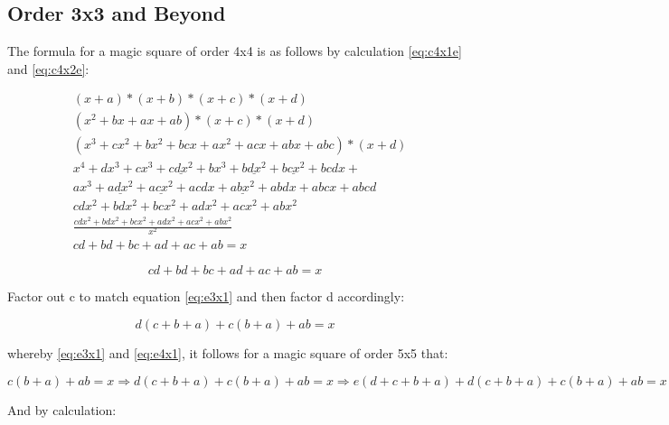 \documentclass[a4paper]{article}
\begin{document}
\subsection{Order 3x3 and Beyond}
The formula for a magic square of order 4x4 is as follows by calculation \eqref{eq:c4x1e} and \eqref{eq:c4x2e}:

\begin{equation*} \begin{aligned}
& (x + a) * (x + b) * (x + c) * (x + d) \\
& (x^2 + bx + ax + ab) * (x + c) * (x + d) \\
& (x^3 + cx^2 + bx^2 + bcx + ax^2 + acx + abx + abc) * (x + d) \\
& x^4 + dx^3 + cx^3 + \underline{cdx^2} + bx^3 + \underline{bdx^2} + \underline{bcx^2} + bcdx + \\ & ax^3 + \underline{adx^2} + \underline{acx^2} + acdx + \underline{abx^2} + abdx + abcx + abcd \\
& cdx^2 + bdx^2 + bcx^2 + adx^2 + acx^2 + abx^2 \\
& \frac{cdx^2 + bdx^2 + bcx^2 + adx^2 + acx^2 + abx^2}{x^2} \\
& cd + bd + bc + ad + ac + ab = x
\end{aligned} \end{equation*}

\begin{equation}
cd + bd + bc + ad + ac + ab = x \label{eq:ee4x1}
\end{equation}

Factor out c to match equation \eqref{eq:e3x1} and then factor d accordingly:

\begin{equation} \label{eq:e4x1}
d(c + b + a) + c(b + a) + ab = x
\end{equation}

whereby \eqref{eq:e3x1} and \eqref{eq:e4x1}, it follows for a magic square of order 5x5 that:

\begin{equation}
c(b + a) + ab = x \Rightarrow d(c + b + a) + c(b + a) + ab = x \Rightarrow e(d + c + b + a) + d(c + b + a) + c(b + a) + ab = x \label{eq:q5x1}
\end{equation}

And by calculation:
\end{document}
